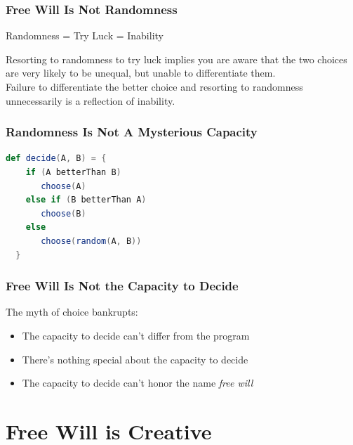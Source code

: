 \documentclass[xcolor=dvipsnames]{beamer}
\theoremstyle{definition}
\begin{document}
\begin{frame}[fragile]
  \frametitle{Free Will Is Not Randomness}

  \begin{center}
    \alert{\Large{Randomness = Try Luck = Inability}}\\[0.1cm]
  \end{center}

  Resorting to randomness to try luck implies you are aware that the two choices are very likely to be unequal, but unable to differentiate them.\\[0.3cm]

  Failure to differentiate the better choice and resorting to randomness \alert{unnecessarily} is a reflection of \alert{inability}.\\[0.3cm]

\end{frame}


\begin{frame}[fragile]
  \frametitle{Randomness Is Not A Mysterious Capacity}

  \begin{lstlisting}[language=Scala]
  def decide(A, B) = {
    if (A betterThan B)
       choose(A)
    else if (B betterThan A)
       choose(B)
    else
       choose(random(A, B))
  }
  \end{lstlisting}
\end{frame}

\begin{frame}[fragile]
  \frametitle{Free Will Is Not the Capacity to Decide}

  The \alert{myth of choice} bankrupts:
  \begin{itemize}
  \item The capacity to decide can't differ from the program
  \item There's nothing special about the capacity to decide
  \item The capacity to decide can't honor the name \emph{free will}
  \end{itemize}
\end{frame}


\section{Free Will is Creative} %
\label{sec:creative}
\end{document}
